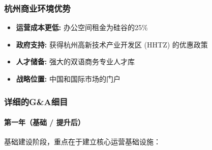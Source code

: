 \documentclass[11点, A4纸, 单面]{article}
\begin{document}
\subsubsection{杭州商业环境优势}
\begin{itemize}
    \item \textbf{运营成本更低:} 办公空间租金为硅谷的25\%
    \item \textbf{政府支持:}  获得杭州高新技术产业开发区 (HHTZ) 的优惠政策
    \item \textbf{人才储备:} 强大的双语商务专业人才库
    \item \textbf{战略位置:} 中国和国际市场的门户
\end{itemize}

\subsubsection{详细的G\&A细目}

\paragraph{第一年（基础 / 提升后）}
基础建设阶段，重点在于建立核心运营基础设施：
\end{document}

